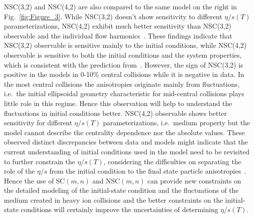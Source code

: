 \documentclass[ALICE,manyauthors]{cernphprep}
\begin{document}
NSC(3,2) and NSC(4,2) are also compared to the same model on the right in Fig.~\ref{fig:Figure_3}. 
While NSC(3,2) doesn't show sensitivity to  different $\eta/s(T)$ parameterizations,  NSC(4,2) exhibit much better sensitivity
than NSC(3,2) observable and the individual flow harmonics~\cite{Niemi:2015qia}.
These findings indicate that NSC(3,2) observable is sensitive mainly to the initial conditions, while NSC(4,2) observable is sensitive to both the initial conditions and the system properties, which is consistent with the prediction from~\cite{Niemi:2012aj}.
However, the sign of NSC(3,2) is positive in the models in 0-10\% central collisions while it is negative in data.
In the most central collisions the anisotropies originate mainly from fluctuations, i.e.\ the initial ellipsoidal geometry characteristic for mid-central collisions plays little role in this regime. Hence this observation will help to understand the fluctuations in initial conditions better.
NSC(4,2) observable shows better sensitivity for different $\eta/s(T)$ parameterizations, i.e.\ medium property but the model cannot describe the centrality dependence nor the absolute values. These observed distinct discrepancies between data and models might indicate that the current understanding of initial conditions used in the model need to be revisited
to further constrain the $\eta/s(T)$, considering the difficulties on separating the role of the $\eta/s$  from the initial condition to the final state particle anisotropies~\cite{Romatschke:2007mq,Shen:2011zc}.
Hence the use of SC$(m,n)$ and NSC$(m,n)$ can provide new constraints on the detailed modeling of the initial-state condition and the fluctuations of the medium created in heavy ion collisions and the better constraints on the initial-state conditions will certainly improve the uncertainties of determining $\eta/s(T)$.
\end{document}
